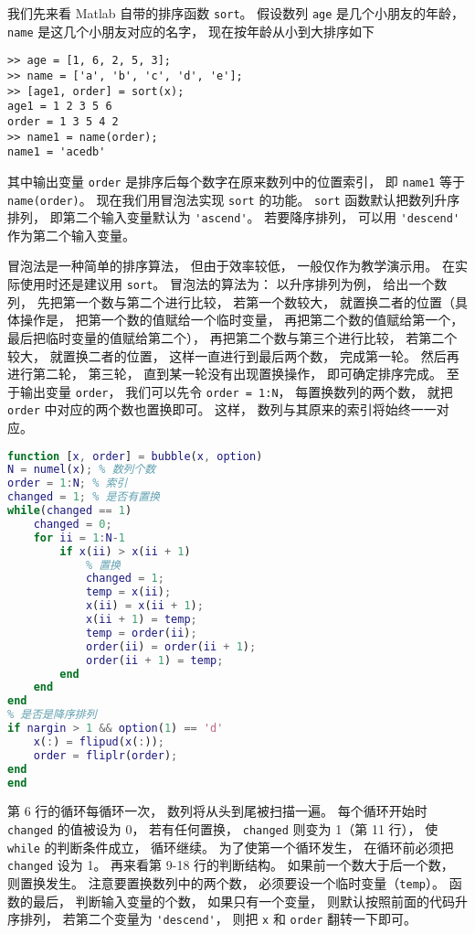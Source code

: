 
我们先来看 Matlab 自带的排序函数 \verb`sort`。 假设数列 \verb`age` 是几个小朋友的年龄， \verb`name` 是这几个小朋友对应的名字， 现在按年龄从小到大排序如下
\begin{lstlisting}[language=matlabC]
>> age = [1, 6, 2, 5, 3];
>> name = ['a', 'b', 'c', 'd', 'e'];
>> [age1, order] = sort(x);
age1 = 1 2 3 5 6
order = 1 3 5 4 2
>> name1 = name(order);
name1 = 'acedb'
\end{lstlisting}
其中输出变量 \verb`order` 是排序后每个数字在原来数列中的位置索引， 即 \verb`name1` 等于 \verb`name(order)`。 现在我们用冒泡法实现 \verb`sort` 的功能。 \verb`sort` 函数默认把数列升序排列， 即第二个输入变量默认为 \verb`'ascend'`。 若要降序排列， 可以用 \verb`'descend'` 作为第二个输入变量。

冒泡法是一种简单的排序算法， 但由于效率较低， 一般仅作为教学演示用。 在实际使用时还是建议用 \verb`sort`。 冒泡法的算法为： 以升序排列为例， 给出一个数列， 先把第一个数与第二个进行比较， 若第一个数较大， 就置换二者的位置（具体操作是， 把第一个数的值赋给一个临时变量， 再把第二个数的值赋给第一个， 最后把临时变量的值赋给第二个）， 再把第二个数与第三个进行比较， 若第二个较大， 就置换二者的位置， 这样一直进行到最后两个数， 完成第一轮。 然后再进行第二轮， 第三轮， 直到某一轮没有出现置换操作， 即可确定排序完成。 至于输出变量 \verb`order`， 我们可以先令 \verb`order = 1:N`， 每置换数列的两个数， 就把 \verb`order` 中对应的两个数也置换即可。 这样， 数列与其原来的索引将始终一一对应。 

\begin{lstlisting}[language=matlab, caption=bubble.m]
% 冒泡法排序
function [x, order] = bubble(x, option)
N = numel(x); % 数列个数
order = 1:N; % 索引
changed = 1; % 是否有置换
while(changed == 1)
    changed = 0;
    for ii = 1:N-1
        if x(ii) > x(ii + 1)
            % 置换
            changed = 1;
            temp = x(ii);
            x(ii) = x(ii + 1);
            x(ii + 1) = temp;
            temp = order(ii);
            order(ii) = order(ii + 1);
            order(ii + 1) = temp;
        end
    end
end
% 是否是降序排列
if nargin > 1 && option(1) == 'd'
    x(:) = flipud(x(:));
    order = fliplr(order);
end
end
\end{lstlisting}

第 6 行的循环每循环一次， 数列将从头到尾被扫描一遍。 每个循环开始时 \verb`changed` 的值被设为 0， 若有任何置换， \verb`changed` 则变为 1（第 11 行）， 使 \verb`while` 的判断条件成立， 循环继续。 为了使第一个循环发生， 在循环前必须把 \verb`changed` 设为 1。 再来看第 9-18 行的判断结构。 如果前一个数大于后一个数， 则置换发生。 注意要置换数列中的两个数， 必须要设一个临时变量（\verb`temp`）。 函数的最后， 判断输入变量的个数， 如果只有一个变量， 则默认按照前面的代码升序排列， 若第二个变量为 \verb`'descend'`， 则把 \verb`x` 和 \verb`order` 翻转一下即可。
